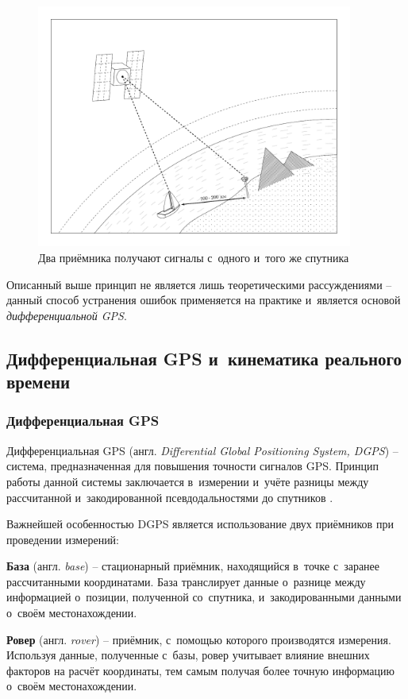 \begin{figure}[h!]
  \centering
  \setlength{\fboxsep}{5pt}
  \includegraphics[height=8cm]{img/tikz/dgps-one/pic}
  \caption{Два приёмника получают сигналы с~одного и~того же спутника}\label{fig:dgps-one}
\end{figure}

Описанный выше принцип не является лишь теоретическими рассуждениями -- данный способ устранения ошибок применяется на практике и~является основой \emph{дифференциальной GPS}.

\subsection{Дифференциальная GPS и~кинематика реального времени}
\label{subsec:dgps-and-rtk}

\subsubsection{Дифференциальная GPS}
\label{subsec:dgps}

Дифференциальная GPS (англ. \emph{Differential Global Positioning System, DGPS}) -- система, предназначенная для повышения точности сигналов GPS. Принцип работы данной системы заключается в~измерении и~учёте разницы между рассчитанной и~закодированной псевдодальностями до спутников \cite{Trimble}.

Важнейшей особенностью DGPS является использование двух приёмников при проведении измерений:

\begin{dashitemize}
  \item \textbf{База} (англ. \emph{base}) -- стационарный приёмник, находящийся в~точке с~заранее рассчитанными координатами. База транслирует данные о~разнице между информацией о~позиции, полученной со~спутника, и~закодированными данными о~своём местонахождении.
  \item \textbf{Ровер} (англ. \emph{rover}) -- приёмник, с~помощью которого производятся измерения. Используя данные, полученные с~базы, ровер учитывает влияние внешних факторов на расчёт координаты, тем самым получая более точную информацию о~своём местонахождении.
\end{dashitemize}

